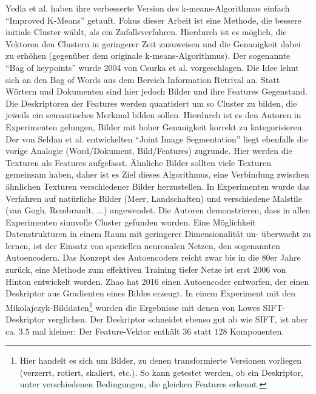 Yedla et al. \cite{ikm2010} haben ihre verbesserte Version des k-means-Algorithmus einfach \enquote{Improved K-Means} getauft. Fokus dieser Arbeit ist eine Methode, die bessere initiale Cluster wählt, als ein Zufallsverfahren. Hierdurch ist es möglich, die Vektoren den Clustern in geringerer Zeit zuzuweisen und die Genauigkeit dabei zu erhöhen (gegenüber dem originale k-means-Algorithmus).
\newline\newline
Der sogenannte \enquote{Bag of keypoints} wurde 2004 von Csurka et al. \cite{bok2004} vorgeschlagen. Die Idee lehnt sich an den Bag of Words aus dem Bereich Information Retrival an. Statt Wörtern und Dokumenten sind hier jedoch Bilder und ihre Features Gegenstand. Die Deskriptoren der Features werden quantisiert um so Cluster zu bilden, die jeweils ein semantisches Merkmal bilden sollen. Hierdurch ist es den Autoren in Experimenten gelungen, Bilder mit hoher Genauigkeit korrekt zu kategorisieren.
\newline\newline
Der von Seldan et al. \cite{jis2003} entwickelten \enquote{Joint Image Segmentation} liegt ebenfalls die vorige Analogie (Word/Dokument, Bild/Features) zugrunde. Hier werden die Texturen als Features aufgefasst. Ähnliche Bilder sollten viele Texturen gemeinsam haben, daher ist es Ziel dieses Algorithmus, eine Verbindung zwischen ähnlichen Texturen verschiedener Bilder herzustellen. In Experimenten wurde das Verfahren auf natürliche Bilder (Meer, Landschaften) und verschiedene Malstile (van Gogh, Rembrandt, ...) angewendet. Die Autoren demonstrieren, dass in allen Experimenten sinnvolle Cluster gefunden wurden.
\newline\newline
Eine Möglichkeit Datenstrukturen in einem Raum mit geringerer Dimensionalität un- überwacht zu lernen, ist der Einsatz von speziellen neuronalen Netzen, den sogenannten Autoencodern. Das Konzept des Autoencoders reicht zwar bis in die 80er Jahre zurück, eine Methode zum effektiven Training tiefer Netze ist erst 2006 von Hinton \cite{dae2006} entwickelt worden. Zhao \cite{aed2016} hat 2016 einen Autoencoder entworfen, der einen Deskriptor aus Gradienten eines Bildes erzeugt. In einem Experiment mit den Mikolajczyk-Bilddaten\footnote{Hier handelt es sich um Bilder, zu denen transformierte Versionen vorliegen (verzerrt, rotiert, skaliert, etc.). So kann getestet werden, ob ein Deskriptor, unter verschiedenen Bedingungen, die gleichen Features erkennt.} wurden die Ergebnisse mit denen von Lowes SIFT-Deskriptor verglichen. Der Deskriptor schneidet ebenso gut ab wie SIFT, ist aber ca. $3.5$ mal kleiner: Der Feature-Vektor enthält $36$ statt $128$ Komponenten.
